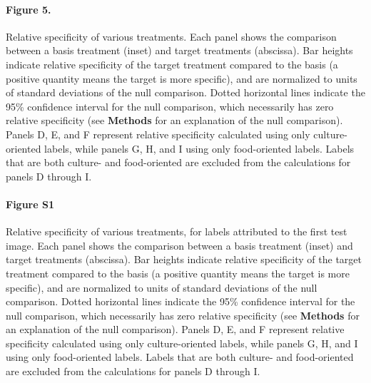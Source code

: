 \documentclass[a4paper]{report}
\begin{document}
\paragraph{Figure 5.}
Relative specificity of various treatments.
Each panel shows the comparison between a basis treatment (inset) and 
target treatments (abscissa).
Bar heights indicate relative specificity of the target 
treatment compared to the basis (a positive quantity means the target 
is more specific), and are normalized to units of standard 
deviations of the null comparison.  Dotted horizontal lines indicate
the 95\% confidence interval for the null comparison, which necessarily
has zero relative specificity (see \textbf{Methods} 
for an explanation of the null comparison).  Panels D, E, and F 
represent relative specificity calculated using only culture-oriented
labels, while panels G, H, and I using only food-oriented labels.
Labels that are both culture- and food-oriented are excluded from the
calculations for panels D through I.

\paragraph{Figure S1}
Relative specificity of various treatments, for labels attributed
to the first test image.
Each panel shows the comparison between a basis treatment (inset) and 
target treatments (abscissa).
Bar heights indicate relative specificity of the target 
treatment compared to the basis (a positive quantity means the target 
is more specific), and are normalized to units of standard 
deviations of the null comparison.  Dotted horizontal lines indicate
the 95\% confidence interval for the null comparison, which necessarily
has zero relative specificity (see \textbf{Methods} 
for an explanation of the null comparison).  Panels D, E, and F 
represent relative specificity calculated using only culture-oriented
labels, while panels G, H, and I using only food-oriented labels.
Labels that are both culture- and food-oriented are excluded from the
calculations for panels D through I.
\end{document}
